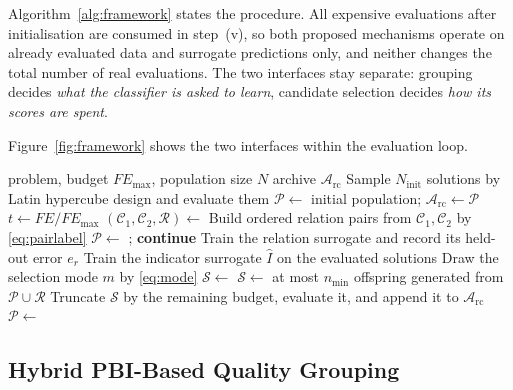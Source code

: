 \documentclass[final,5p,times,twocolumn]{elsarticle}
\begin{document}
Algorithm~\ref{alg:framework} states the procedure. All expensive evaluations
after initialisation are consumed in step~(v), so both proposed mechanisms operate on already
evaluated data and surrogate predictions only, and neither changes the total
number of real evaluations. The two interfaces stay separate: grouping
decides \emph{what the classifier is asked to learn}, candidate selection
decides \emph{how its scores are spent}.

Figure~\ref{fig:framework} shows the two interfaces within the evaluation loop.


\begin{algorithm}[t]
\caption{HPDC-MaOEA}
\label{alg:framework}
\begin{algorithmic}[1]
\Require problem, budget $FE_{\max}$, population size $N$
\Ensure archive $\mathcal{A}_{\mathrm{rc}}$
\State Sample $N_{\mathrm{init}}$ solutions by Latin hypercube design and
       evaluate them
\State $\mathcal{P}\gets$ initial population;
       $\mathcal{A}_{\mathrm{rc}}\gets\mathcal{P}$
  \State $t\gets FE/FE_{\max}$
  \State $(\mathcal{C}_1,\mathcal{C}_2,\mathcal{R})\gets$
  \State Build ordered relation pairs from $\mathcal{C}_1,\mathcal{C}_2$ by
         \eqref{eq:pairlabel}
    \State $\mathcal{P}\gets$
           ;
           \textbf{continue}
  \EndIf
  \State Train the relation surrogate and record its held-out error $e_r$
  \State Train the indicator surrogate $\widehat I$ on the evaluated solutions
  \State Draw the selection mode $m$ by \eqref{eq:mode}
  \State $\mathcal{S}\gets$
    \State $\mathcal{S}\gets$ at most $n_{\min}$ offspring generated from
           $\mathcal{P}\cup\mathcal{R}$
  \EndIf
  \State Truncate $\mathcal{S}$ by the remaining budget, evaluate it, and
         append it to $\mathcal{A}_{\mathrm{rc}}$
  \State $\mathcal{P}\gets$ 
\EndWhile
\end{algorithmic}
\end{algorithm}

\subsection{Hybrid PBI-Based Quality Grouping}
\label{sec:method:hpc}
\end{document}
